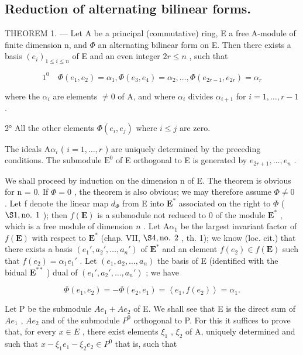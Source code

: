 \subsection{Reduction of alternating bilinear forms.}

THEOREM 1. --- Let A be a principal (commutative) ring, E a free A-module of finite dimension n, and \(\Phi\) an alternating bilinear form on E. Then there exists a basis \((e_i)_{1 \leqslant i \leqslant n}\) of E and an even integer \(2r \leqslant n\) , such that

\[
1 ^ {0} \quad \Phi (e _ {1}, e _ {2}) = \alpha_ {1}, \Phi (e _ {3}, e _ {4}) = \alpha_ {2}, \dots , \Phi (e _ {2 r - 1}, e _ {2 r}) = \alpha_ {r}
\]

where the \(\alpha_{i}\) are elements \(\neq 0\) of A, and where \(\alpha_{i}\) divides \(\alpha_{i+1}\) for \(i=1,\ldots,r-1\) .

2° All the other elements \(\Phi(e_{i}, e_{j})\) where \(i \leqslant j\) are zero.

The ideals \(\mathrm{A}\alpha_{i}\) ( \(i=1,\ldots,r\) ) are uniquely determined by the preceding conditions. The submodule \(\mathrm{E}^{0}\) of E orthogonal to E is generated by \(e_{2r+1},\ldots,e_{n}\) .

We shall proceed by induction on the dimension n of E. The theorem is obvious for n = 0. If \(\Phi = 0\) , the theorem is also obvious; we may therefore assume \(\Phi \neq 0\) . Let f denote the linear map \(d_{\Phi}\) from E into \(\mathbf{E}^*\) associated on the right to \(\Phi\) ( \(\S 1, \text{no. 1}\) ); then \(f(\mathbf{E})\) is a submodule not reduced to 0 of the module \(\mathbf{E}^*\) , which is a free module of dimension \(n\) . Let \(\mathrm{A}\alpha_{1}\) be the largest invariant factor of \(f(\mathbf{E})\) with respect to \(\mathbf{E}^*\) (chap. VII, \(\S 4, \text{no. 2}\) , th. 1); we know (loc. cit.) that there exists a basis \((e_{1}', a_{2}', \ldots, a_{n}')\) of \(\mathbf{E}^*\) and an element \(f(e_{2}) \in f(\mathbf{E})\) such that \(f(e_{2}) = \alpha_{1}e_{1}'\) . Let \((e_{1}, a_{2}, \ldots, a_{n})\) the basis of E (identified with the bidual \(\mathbf{E}^{**}\) ) dual of \((e_{1}', a_{2}', \ldots, a_{n}')\) ; we have

\[
\Phi (e _ {1}, e _ {2}) = - \Phi (e _ {2}, e _ {1}) = \left\langle e _ {1}, f (e _ {2}) \right\rangle = \alpha_ {1}.\tag{1}
\]

Let P be the submodule \(Ae_{1} + Ae_{2}\) of E. We shall see that E is the direct sum of \(Ae_{1}\) , \(Ae_{2}\) and of the submodule \(P^{0}\) orthogonal to P. For this it suffices to prove that, for every \(x \in E\) , there exist elements \(\xi_{1}\) , \(\xi_{2}\) of A, uniquely determined and such that \(x - \xi_{1}e_{1} - \xi_{2}e_{2} \in P^{0}\) that is, such that

